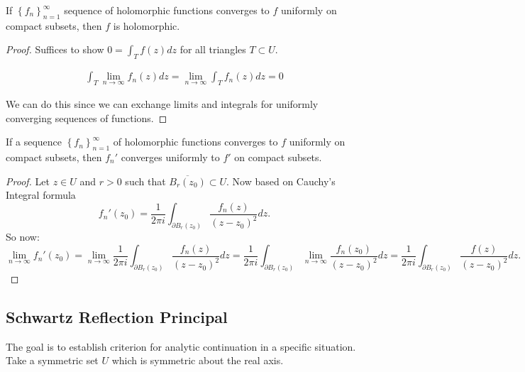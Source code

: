 \documentclass{article}
\begin{document}
\begin{thrm}{}{}
If \( \left\{ f_{n}  \right\}_{n = 1}^{\infty}   \) sequence of holomorphic functions converges to \( f\) uniformly on compact subsets, then \( f \) is holomorphic. 
\tcbline
\begin{proof}
Suffices to show \( 0 = \int_T f(z) dz \) for all triangles \( T \subset U  \). 

\begin{align*}
    \int_T \lim_{n \to \infty} f_{n} (z) dz = \lim_{n \to \infty} \int _Tf_{n} (z) dz = 0
\end{align*}

We can do this since we can exchange limits and integrals for uniformly converging sequences of functions. 

\end{proof}

\end{thrm}

\begin{thrm}{}{}
    If a sequence \( \left\{ f_{n}  \right\}_{n = 1}^{\infty}   \) of holomorphic functions converges to \( f\) uniformly on compact subsets, then \( f_{n} ' \) converges uniformly to \( f' \) on compact subsets. 

    \tcbline

    \begin{proof}
    Let \( z \in U \) and \( r>0 \) such that \( \overline{B_{r} (z_0)}  \subset U\). Now based on Cauchy's Integral formula
    \[
        f_{n} '(z_0) = \frac{1}{2\pi i}\int _{\partial B_{r} (z_0)} \frac{f_{n} (z)}{(z - z_0)^2}dz.  
    \]
    So now:
    \[
        \lim_{n \to \infty} f_{n} '(z_0) = \lim_{n \to \infty}  \frac{1}{2\pi i}\int _{\partial B_{r} (z_0)} \frac{f_{n} (z)}{(z - z_0)^2}dz = \frac{1}{2\pi i }   \int _{\partial B_{r} (z_0)}\lim_{n \to \infty} \frac{f_{n} (z_0)}{(z - z_0)^2} dz =  \frac{1}{2\pi i}\int _{\partial B_{r} (z_0)} \frac{f (z)}{(z - z_0)^2}dz.
    \]
    \end{proof}
    
\end{thrm}
\subsection{Schwartz Reflection Principal}

The goal is to establish criterion for analytic continuation in a specific situation. Take a symmetric set \( U \) which is symmetric about the real axis. 
\end{document}
